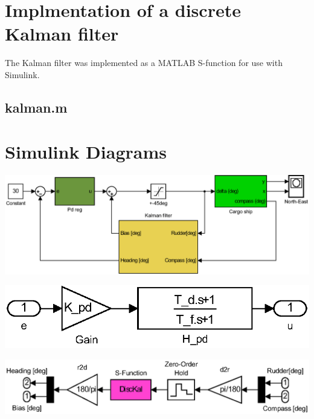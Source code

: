 \appendix
{}

\section{Implmentation of a discrete Kalman filter}\label{sec:KFimplementation}
The Kalman filter was implemented as a MATLAB S-function for use with Simulink.
\subsection*{kalman.m}


\newpage
\section{Simulink Diagrams}\label{sec:simulink}
\begin{center}
	\centering
		\includegraphics[width = \textwidth]{figures/simulink/sim_p5p5e_sim_p5p5e_sim.eps}
\label{fig:simulink_total}
\end{center}

\begin{center}
	\centering
		\includegraphics[width = \textwidth]{figures/simulink/sim_p5p5e_sim_pdreg.eps}
\label{fig:simulink_PD}
\end{center}

\begin{center}
	\centering
		\includegraphics[width = \textwidth]{figures/simulink/sim_p5p5e_sim_kalmanfilter.eps}
\label{fig:simulink_Kalman}
\end{center}